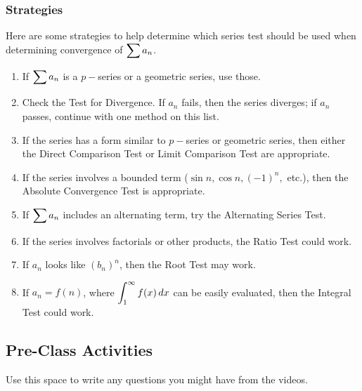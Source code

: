 \documentclass[notes]{subfiles}
\begin{document}
	\subsubsection*{Strategies}		
		Here are some strategies to help determine which series test should be used when determining convergence of $\displaystyle \sum a_n$.
		\begin{enumerate}[(1)]
			\item If $\displaystyle \sum a_n$ is a $p-$series or a geometric series, use those.
			\item Check the Test for Divergence.  If $a_n$ fails, then the series diverges; if $a_n$ passes, continue with one method on this list.
			\item If the series has a form similar to $p-$series or geometric series, then either the Direct Comparison Test or Limit Comparison Test are appropriate.
			\item If the series involves a bounded term ($\sin n, \cos n, (-1)^n,$ etc.), then the Absolute Convergence Test is appropriate.
			\item If $\displaystyle \sum a_n$ includes an alternating term, try the Alternating Series Test.
			\item If the series involves factorials or other products, the Ratio Test could work.
			\item If $a_n$ looks like $(b_n)^n$, then the Root Test may work.
			\item If $a_n = f(n)$, where $\displaystyle \int_1^\infty f(x)\, dx$ can be easily evaluated, then the Integral Test could work.
		\end{enumerate}
			\newpage
			
	\subsection*{Pre-Class Activities}
		\begin{ex}
			Use this space to write any questions you might have from the videos.
		\end{ex}
			
\end{document}
